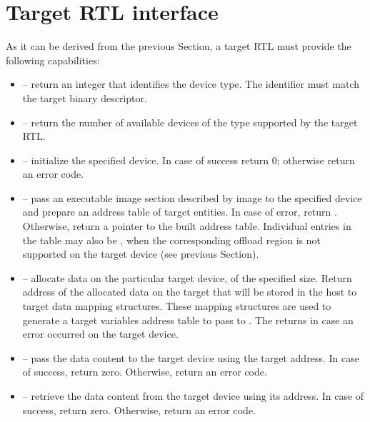 \section{Target RTL interface}\label{sc:TargetRTLInterface}

As it can be derived from the previous Section, a target RTL must provide the following capabilities:
\begin{itemize}
  \item {} – return an integer that identifies the device type. The identifier must match the target binary descriptor.

  \item {} – return the number of available devices of the type supported by the target RTL.

  \item {} – initialize the specified device. In case of success return 0; otherwise return an error code. 

  \item {} – pass an executable image section described by image to the specified device and prepare an address table of target entities. In case of error, return . Otherwise, return a pointer to the built address table. Individual entries in the table may also be , when the corresponding offload region is not supported on the target device (see previous Section).

  \item {} – allocate data on the particular target device, of the specified size. Return address of the allocated data on the target that will be stored in the \libomptarget host to target data mapping structures. These mapping structures are used to generate a target variables address table to pass to . The returns  in case an error occurred on the target device.

  \item {} – pass the data content to the target device using the target address. In case of success, return zero. Otherwise, return an error code.

  \item {} – retrieve the data content from the target device using its address. In case of success, return zero. Otherwise, return an error code.


\end{itemize}
